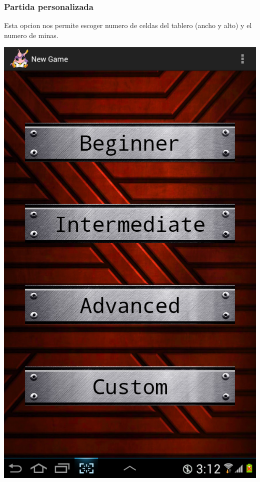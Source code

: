 \documentclass[11pt]{article} %
\begin{document}
\subsubsection{Partida personalizada}
Esta opcion nos permite escoger numero de celdas del tablero (ancho y alto) y el numero de minas.
\begin{center}
\includegraphics[scale=0.2]{Imagenes/SSMenuNewGame.png}
\end{center}
\end{document}
